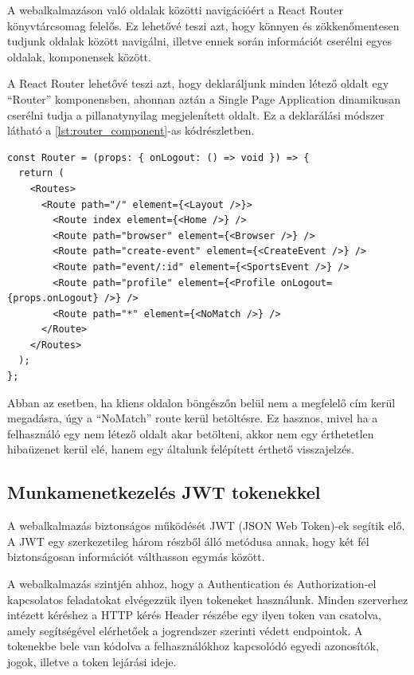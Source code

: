 A webalkalmazáson való oldalak közötti navigációért a React Router\cite{reactrouterdocs} könyvtárcsomag felelős. Ez lehetővé teszi azt, hogy könnyen és zökkenőmentesen tudjunk oldalak között navigálni, illetve ennek során információt cserélni egyes oldalak, komponensek között.

A React Router lehetővé teszi azt, hogy deklaráljunk minden létező oldalt egy ``Router'' komponensben, ahonnan aztán a Single Page Application dinamikusan cserélni tudja a pillanatynyilag megjelenített oldalt. Ez a deklarálási módszer látható a \ref{lst:router_component}-as kódrészletben.

\begin{lstlisting}[caption={Route-ok deklarálása}, label={lst:router_component}]
const Router = (props: { onLogout: () => void }) => {
  return (
    <Routes>
      <Route path="/" element={<Layout />}>
        <Route index element={<Home />} />
        <Route path="browser" element={<Browser />} />
        <Route path="create-event" element={<CreateEvent />} />
        <Route path="event/:id" element={<SportsEvent />} />
        <Route path="profile" element={<Profile onLogout={props.onLogout} />} />
        <Route path="*" element={<NoMatch />} />
      </Route>
    </Routes>
  );
};
\end{lstlisting}

Abban az esetben, ha kliens oldalon böngészőn belül nem a megfelelő cím kerül megadásra, úgy a ``NoMatch'' route kerül betöltésre. Ez hasznos, mivel ha a felhasználó egy nem létező oldalt akar betölteni, akkor nem egy érthetetlen hibaüzenet kerül elé, hanem egy általunk felépített érthető visszajelzés.

\clearpage

\subsection{Munkamenetkezelés JWT tokenekkel}

A webalkalmazás biztonságos működését JWT (JSON Web Token)-ek segítik elő. A JWT egy szerkezetileg három részből álló metódusa annak, hogy két fél biztonságosan információt válthasson egymás között. 

A webalkalmazás szintjén ahhoz, hogy a Authentication és Authorization-el kapcsolatos feladatokat elvégezzük ilyen tokeneket használunk. Minden szerverhez intézett kéréshez a HTTP kérés Header részébe egy ilyen token van csatolva, amely segítségével elérhetőek a jogrendszer szerinti védett endpointok. A tokenekbe bele van kódolva a felhasználókhoz kapcsolódó egyedi azonosítók, jogok, illetve a token lejárási ideje.


